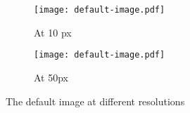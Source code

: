 \usepackage{caption}
\usepackage{subcaption}

\begin{figure}
	\centering
	\begin{subfigure}[b]{0.3\textwidth}
		\centering
		\texttt{[image: default-image.pdf]}
		\caption{At 10 px}
	\end{subfigure}%
	\hspace{1cm}
	\begin{subfigure}[b]{0.3\textwidth}
		\centering
		\texttt{[image: default-image.pdf]}
		\caption{At 50px}
	\end{subfigure}
	\caption{The default image at different resolutions}
\end{figure}
